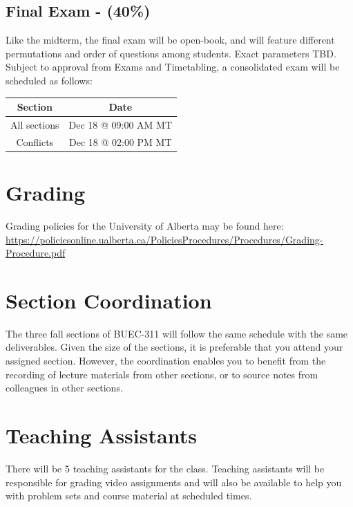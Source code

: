 \documentclass[11pt,]{article}
\begin{document}
\hypertarget{final-exam---40}{%
\subsection{Final Exam - (40\%)}\label{final-exam---40}}

Like the midterm, the final exam will be open-book, and will feature
different permutations and order of questions among students. Exact
parameters TBD. Subject to approval from Exams and Timetabling, a
consolidated exam will be scheduled as follows:

\begin{table}[!h]
\centering
\begin{tabular}{cc}
\toprule
Section & Date\\
\midrule
All sections & Dec 18 @ 09:00 AM MT\\
Conflicts & Dec 18 @ 02:00 PM MT\\
\bottomrule
\end{tabular}
\end{table}


\hypertarget{grading}{%
\section{Grading}\label{grading}}

Grading policies for the University of Alberta may be found here:
\url{https://policiesonline.ualberta.ca/PoliciesProcedures/Procedures/Grading-Procedure.pdf}



\hypertarget{section-coordination}{%
\section{Section Coordination}\label{section-coordination}}

The three fall sections of BUEC-311 will follow the same schedule with
the same deliverables. Given the size of the sections, it is preferable
that you attend your assigned section. However, the coordination enables
you to benefit from the recording of lecture materials from other
sections, or to source notes from colleagues in other sections.

\hypertarget{teaching-assistants}{%
\section{Teaching Assistants}\label{teaching-assistants}}

There will be 5 teaching assistants for the class. Teaching assistants
will be responsible for grading video assignments and will also be
available to help you with problem sets and course material at scheduled
times.
\end{document}

